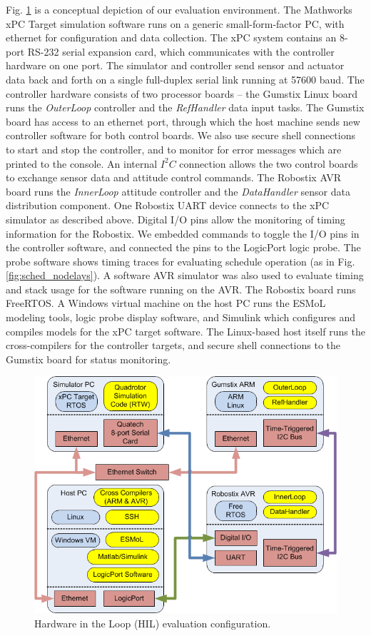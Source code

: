 Fig. \ref{fig:hil_setup} is a conceptual depiction of our evaluation 
environment.  The Mathworks xPC Target simulation software runs on a generic small-form-factor PC, with ethernet for configuration and data collection.  The xPC system contains an 8-port RS-232 serial expansion card, which communicates with the controller hardware on one port.  The simulator and controller send sensor and actuator data back and forth on a single full-duplex serial link running at 57600 baud.  The controller hardware consists of two processor boards -- the Gumstix Linux board runs the \emph{OuterLoop} controller and the 
\emph{RefHandler} data input tasks.  The Gumstix board has access to an ethernet port, through which the host machine sends new controller software for both control boards.  We also use secure shell connections to start and stop the controller, and to monitor for error messages which are printed to the console. An internal $I^2C$ connection allows the two control boards to exchange sensor data and attitude control commands.  The Robostix AVR board runs the \emph{InnerLoop} attitude controller and the \emph{DataHandler} sensor data distribution component.  One Robostix UART device connects to the xPC simulator as described above.  Digital I/O pins allow the monitoring of timing information for the Robostix.  We embedded commands to toggle the I/O pins in the controller software, and connected the pins to the LogicPort logic probe.  The probe software shows timing traces for evaluating schedule operation (as in Fig. \ref{fig:sched_nodelays}). A software AVR simulator was also used to evaluate timing and stack usage for the software running on the AVR.  The Robostix board runs FreeRTOS.  A Windows virtual machine on the host PC runs the ESMoL modeling tools, logic probe display software, and Simulink which configures and compiles models for the xPC target software.  The Linux-based host itself runs the cross-compilers for the controller targets, and secure shell connections to the Gumstix board for status monitoring.

\begin{figure}
   \centering
   \includegraphics[width=0.85\columnwidth]{figures/hil_setup.png}
   \caption{Hardware in the Loop (HIL) evaluation configuration.}
   \label{fig:hil_setup}
\end{figure}

